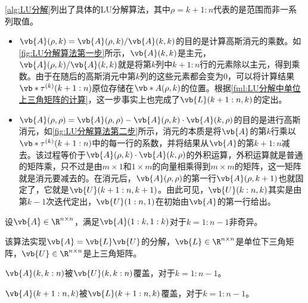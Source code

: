 \cref{alg:LU分解}列出了具体的LU分解算法，其中$\rho=k+1:n$代表的是范围而非一系列取值。
\begin{itemize}
    \item $\vb{A}(\rho,k)=\vb{A}(\rho,k)/\vb{A}(k,k)$的目的是计算高斯消元的乘数。如\cref{fig:LU分解算法第一步}所示，$\vb{A}(k,k)$是主元，$\vb{A}(\rho,k)/\vb{A}(k,k)$就是将第$k$列中$k+1:n$行的元素除以主元，得到乘数。由于在随后的高斯消元中第$k$列的这些元素都会变为$0$，可以将计算结果$\vb*{\tau}^{(k)}(k+1:n)$原位存储在$\vb*{A}(\rho,k)$的位置。根据\cref{fml:LU分解中单位上三角矩阵的计算}，这一步事实上也完成了$\vb{L}(k+1:n,k)$的定出。
    \item $\vb{A}(\rho,\rho)=\vb{A}(\rho,\rho)-\vb{A}(\rho,k)\cdot\vb{A}(k,\rho)$的目的是进行高斯消元，如\cref{fig:LU分解算法第二步}所示，消元的本质是将$\vb{A}$的第$k$行乘以$\vb*{\tau}^{(k)}(k+1:n)$中的每一行的系数，并将结果从$\vb{A}$的第$k+1:n$减去。该过程等价于$\vb{A}(\rho,k)\cdot\vb{A}(k,\rho)$的外积运算，外积运算就是普通的矩阵乘，只不过是由$m\times 1$和$1\times m$的向量相乘得到$m\times m$的矩阵，这一矩阵就是消元要减去的。在消元后，$\vb{A}(\rho,\rho)$的第一行$\vb{A}(\rho,k+1)$也就固定了，它就是$\vb{U}(k+1:n,k+1)$。由此可见，$\vb{U}(k:n,k)$其实是由第$k-1$次迭代定出，$\vb{U}(1:n,1)$在初始由$\vb{A}$的第一行给出。
\end{itemize}
\begin{BoxAlgorithm}[LU分解]
    设$\vb{A}\in\R^{n\times n}$，满足$\vb{A}(1:k,1:k)$对于$k=1:n-1$非奇异。

    该算法实现$\vb{A}=\vb{L}\vb{U}$的分解，$\vb{L}\in\R^{n\times n}$是单位下三角矩阵，$\vb{U}\in\R^{n\times n}$是上三角矩阵。

    $\vb{A}(k,k:n)$被$\vb{U}(k,k:n)$覆盖，对于$k=1:n-1$。
    
    $\vb{A}(k+1:n,k)$被$\vb{L}(k+1:n,k)$覆盖，对于$k=1:n-1$。

    \begin{Algoplain}
    \end{Algoplain}
\end{BoxAlgorithm}  
